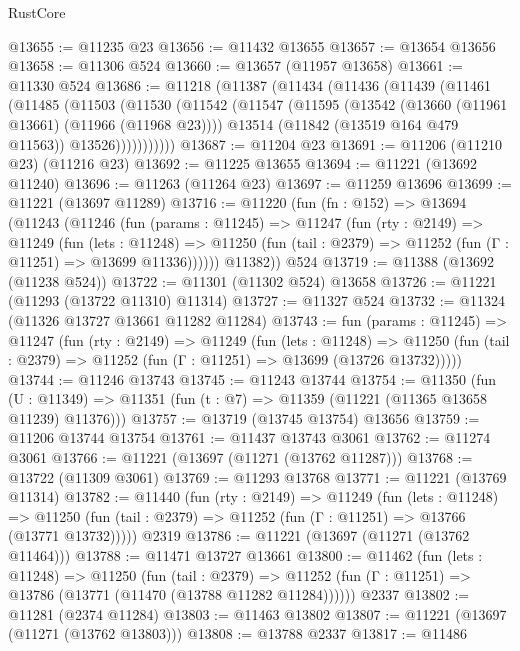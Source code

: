 \begin{lexlean}{RustCore}
\begin{coremodule}
@13655 := @11235 @23
@13656 := @11432 @13655
@13657 := @13654 @13656
@13658 := @11306 @524
@13660 := @13657 (@11957 @13658)
@13661 := @11330 @524
@13686 := @11218
    (@11387
      (@11434
        (@11436
          (@11439
            (@11461
              (@11485
                (@11503
                  (@11530
                    (@11542
                      (@11547
                        (@11595
                          (@13542 (@13660 (@11961 @13661) (@11966 (@11968 @23))))
                          @13514
                          (@11842 (@13519 @164 @479 @11563))
                          @13526)))))))))))
@13687 := @11204 @23
@13691 := @11206 (@11210 @23) (@11216 @23)
@13692 := @11225 @13655
@13694 := @11221 (@13692 @11240)
@13696 := @11263 (@11264 @23)
@13697 := @11259 @13696
@13699 := @11221 (@13697 @11289)
@13716 := @11220
    (fun (fn : @152) =>
    @13694
      (@11243
        (@11246
          (fun (params : @11245) =>
          @11247
            (fun (rty : @2149) =>
            @11249
              (fun (lets : @11248) =>
              @11250 (fun (tail : @2379) => @11252 (fun (Γ : @11251) => @13699 @11336))))))
        @11382))
    @524
@13719 := @11388 (@13692 (@11238 @524))
@13722 := @11301 (@11302 @524) @13658
@13726 := @11221 (@11293 (@13722 @11310) @11314)
@13727 := @11327 @524
@13732 := @11324 (@11326 @13727 @13661 @11282 @11284)
@13743 := fun (params : @11245) =>
  @11247
    (fun (rty : @2149) =>
    @11249
      (fun (lets : @11248) =>
      @11250 (fun (tail : @2379) => @11252 (fun (Γ : @11251) => @13699 (@13726 @13732)))))
@13744 := @11246 @13743
@13745 := @11243 @13744
@13754 := @11350
    (fun (U : @11349) => @11351 (fun (t : @7) => @11359 (@11221 (@11365 @13658 @11239) @11376)))
@13757 := @13719 (@13745 @13754) @13656
@13759 := @11206 @13744 @13754
@13761 := @11437 @13743 @3061
@13762 := @11274 @3061
@13766 := @11221 (@13697 (@11271 (@13762 @11287)))
@13768 := @13722 (@11309 @3061)
@13769 := @11293 @13768
@13771 := @11221 (@13769 @11314)
@13782 := @11440
    (fun (rty : @2149) =>
    @11249
      (fun (lets : @11248) =>
      @11250 (fun (tail : @2379) => @11252 (fun (Γ : @11251) => @13766 (@13771 @13732)))))
    @2319
@13786 := @11221 (@13697 (@11271 (@13762 @11464)))
@13788 := @11471 @13727 @13661
@13800 := @11462
    (fun (lets : @11248) =>
    @11250
      (fun (tail : @2379) =>
      @11252 (fun (Γ : @11251) => @13786 (@13771 (@11470 (@13788 @11282 @11284))))))
    @2337
@13802 := @11281 (@2374 @11284)
@13803 := @11463 @13802
@13807 := @11221 (@13697 (@11271 (@13762 @13803)))
@13808 := @13788 @2337
@13817 := @11486

\end{coremodule}
\end{lexlean}
